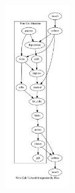 \documentclass[xcolor=dvipsnames]{beamer}
\begin{document}
\begin{frame}
\begin{columns}
\begin{column}{0.7\paperwidth}
    \end{column}
    \begin{column}{0.2\paperwidth}
      \includegraphics[height=8cm]{wc-ls.pdf}
    \end{column}
  \end{columns}
\end{frame}
\end{document}
